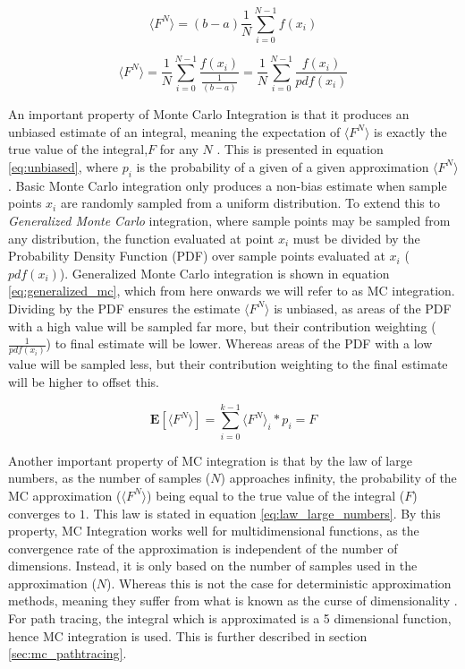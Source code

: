 \documentclass[../dissertation.tex]{subfiles}
\begin{document}
\begin{equation}
\label{eq:monte_carlo}
\langle F^N \rangle = (b - a) \frac{1}{N} \sum^{N-1}_{i=0} f(x_i)
\end{equation}

\begin{equation}
\label{eq:generalized_mc}
\langle F^N \rangle = \frac{1}{N} \sum^{N-1}_{i=0} \frac{f(x_i)}{\frac{1}{(b-a)}} 
 = \frac{1}{N} \sum^{N-1}_{i=0} \frac{f(x_i)}{pdf(x_i)}
\end{equation}

An important property of Monte Carlo Integration is that it produces an unbiased estimate of an integral, meaning the expectation of $\langle F^N \rangle$ is exactly the true value of the integral,$F$ for any $N$ \cite{morokoff1995quasi}. This is presented in equation \ref{eq:unbiased}, where $p_i$ is the probability of a given of a given approximation $\langle F^N \rangle$. Basic Monte Carlo integration only produces a non-bias estimate when sample points $x_i$ are randomly sampled from a uniform distribution. To extend this to \textit{Generalized Monte Carlo} integration, where sample points may be sampled from any distribution, the function evaluated at point $x_i$ must be divided by the Probability Density Function (PDF) over sample points evaluated at $x_i$  ($pdf(x_i)$). Generalized Monte Carlo integration is shown in equation \ref{eq:generalized_mc}, which from here onwards we will refer to as MC integration. Dividing by the PDF ensures the estimate $\langle F^N \rangle$ is unbiased, as areas of the PDF with a high value will be sampled far more, but their contribution weighting ($\frac{1}{pdf(x_i)}$) to final estimate will be lower. Whereas areas of the PDF with a low value will be sampled less, but their contribution weighting to the final estimate will be higher to offset this.

\begin{equation}
\label{eq:unbiased}
\mathbf{E}[\langle F^N \rangle] = \sum_{i = 0}^{k-1} \langle F^N \rangle_i * p_i =  F
\end{equation}

Another important property of MC integration is that by the law of large numbers, as the number of samples ($N$) approaches infinity, the probability of the MC approximation ($\langle F^N \rangle$) being equal to the true value of the integral ($F$) converges to $1$. This law is stated in equation \ref{eq:law_large_numbers}. By this property, MC Integration works well for multidimensional functions, as the convergence rate of the approximation is independent of the number of dimensions. Instead, it is only based on the number of samples used in the approximation ($N$). Whereas this is not the case for deterministic approximation methods, meaning they  suffer from what is known as the curse of dimensionality \cite{bellman1966dynamic}. For path tracing, the integral which is approximated is a 5 dimensional function, hence MC integration is used. This is further described in section \ref{sec:mc_pathtracing}.
\end{document}
